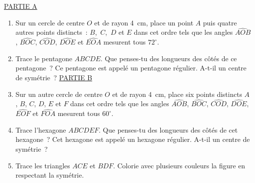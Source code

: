\begin{exercice}
\underline{PARTIE A}
\begin{enumerate}
 \item Sur un cercle de centre $O$ et de rayon 4 cm, place un point $A$ puis quatre autres points distincts : $B$, $C$, $D$ et $E$ dans cet ordre tels que les angles $\widehat{AOB}$, $\widehat{BOC}$, $\widehat{COD}$, $\widehat{DOE}$ et $\widehat{EOA}$ mesurent tous $72^\circ$. 
 \item Trace le pentagone $ABCDE$. Que penses-tu des longueurs des côtés de ce pentagone ? Ce pentagone est appelé un pentagone régulier. A-t-il un centre de symétrie ?
\underline{PARTIE B}
 \item Sur un autre cercle de centre $O$ et de rayon 4 cm, place six points distincts $A$, $B$, $C$, $D$, $E$ et $F$ dans cet ordre tels que les angles $\widehat{AOB}$, $\widehat{BOC}$, $\widehat{COD}$, $\widehat{DOE}$, $\widehat{EOF}$ et $\widehat{FOA}$ mesurent tous $60^\circ$.
 \item Trace l'hexagone $ABCDEF$. Que penses-tu des longueurs des côtés de cet hexagone ? Cet hexagone est appelé un hexagone régulier. A-t-il un centre de symétrie ?
 \item Trace les triangles $ACE$ et $BDF$. Colorie avec plusieurs couleurs la figure en respectant la symétrie.
 \end{enumerate}
\end{exercice}


